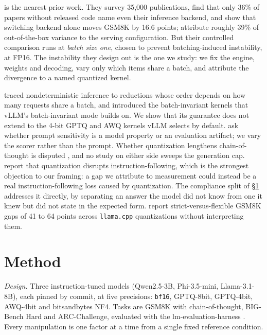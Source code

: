 \documentclass[conference]{IEEEtran}
\begin{document}
\citet{pape2026silent} is the nearest prior work. They survey 35{,}000 publications, find that
only 36\% of papers without released code name even their inference backend, and show that
switching backend alone moves GSM8K by 16.6 points; \citet{masoudian2026sideeffect} attribute
roughly 39\% of out-of-the-box variance to the serving configuration. But their controlled
comparison runs at \emph{batch size one}, chosen to prevent batching-induced instability, at
FP16. The instability they design out is the one we study: we fix the engine, weights and
decoding, vary only which items share a batch, and attribute the divergence to a named
quantized kernel.

\citet{he2025nondeterminism} traced nondeterministic inference to reductions whose order
depends on how many requests share a batch, and introduced the batch-invariant kernels that
vLLM's batch-invariant mode builds on. We show that its guarantee does not extend to the
4-bit GPTQ and AWQ kernels vLLM selects by default. \citet{hua2025flaw} ask whether prompt
sensitivity is a model property or an evaluation artifact; we vary the scorer rather than the
prompt. Whether quantization lengthens chain-of-thought is disputed
\citep{lian2026inflates,lotfi2026longer,liu2025quantization}, and no study on either side
sweeps the generation cap. \citet{lee2025tradeoffs} report that quantization disrupts
instruction-following, which is the strongest objection to our framing: a gap we attribute to
measurement could instead be a real instruction-following loss caused by quantization. The compliance split of
\S\ref{sec:method} addresses it directly, by separating an answer the model did not know from
one it knew but did not state in the expected form. \citet{kurt2026which} report strict-versus-flexible GSM8K gaps of
41 to 64 points across \texttt{llama.cpp} quantizations without interpreting them.

\section{Method}
\label{sec:method}

\emph{Design.} Three instruction-tuned models (Qwen2.5-3B, Phi-3.5-mini, Llama-3.1-8B), each
pinned by commit, at five precisions: \texttt{bf16}, GPTQ-8bit, GPTQ-4bit, AWQ-4bit and
bitsandbytes NF4. Tasks are GSM8K with chain-of-thought, BIG-Bench Hard and ARC-Challenge,
evaluated with the lm-evaluation-harness \citep{biderman2024lessons}. Every manipulation is
one factor at a time from a single fixed reference condition.
\end{document}
